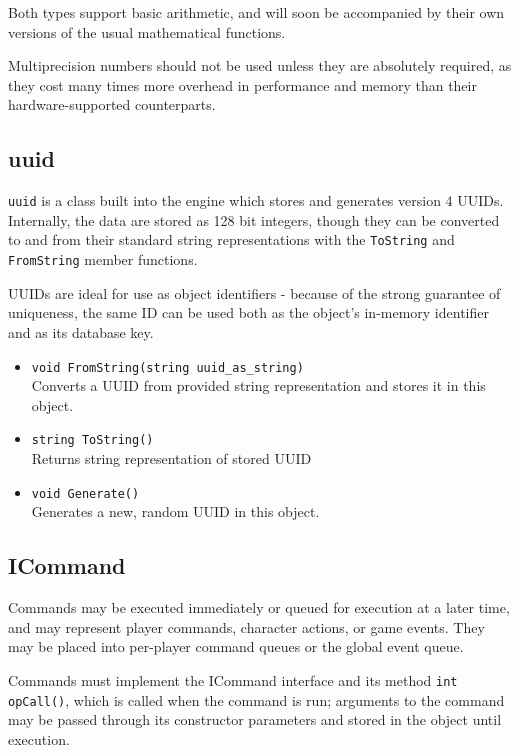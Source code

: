 \documentclass{book}
\begin{document}
Both types support basic arithmetic, and will soon be accompanied by their own
versions of the usual mathematical functions.

Multiprecision numbers should not be used unless they are absolutely required,
as they cost many times more overhead in performance and memory than their
hardware-supported counterparts.

\subsection{uuid}

\texttt{uuid} is a class built into the engine which stores and generates
version 4 UUIDs.  Internally, the data are stored as 128 bit integers, though
they can be converted to and from their standard string representations with the
\texttt{ToString} and \texttt{FromString} member functions.

UUIDs are ideal for use as object identifiers - because of the strong guarantee
of uniqueness, the same ID can be used both as the object's in-memory identifier
and as its database key.

\begin{itemize}
\item \texttt{void FromString(string uuid\_as\_string)}\\
  Converts a UUID from provided string representation and stores it in this object.

\item \texttt{string ToString()}\\
  Returns string representation of stored UUID

\item \texttt{void Generate()}\\
  Generates a new, random UUID in this object.

\end{itemize}

\subsection{ICommand}

Commands may be executed immediately or queued for execution at a later time,
and may represent player commands, character actions, or game events. They may
be placed into per-player command queues or the global event queue.

Commands must implement the ICommand interface and its method \texttt{int
  opCall()}, which is called when the command is run; arguments to the command
may be passed through its constructor parameters and stored in the object until
execution.
\end{document}
